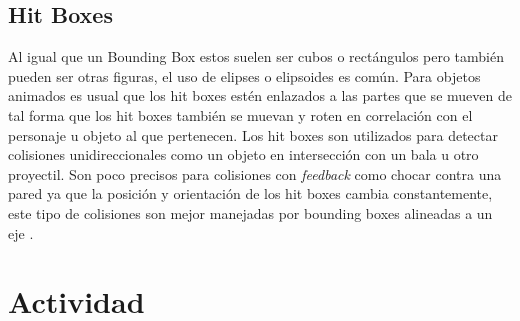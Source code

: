\subsection{Hit Boxes}
Al igual que un Bounding Box estos suelen ser cubos o rectángulos pero también pueden ser otras figuras, el uso de elipses o elipsoides es común. Para objetos animados es usual que los hit boxes estén enlazados a las partes que se mueven de tal forma que los hit boxes también se muevan y roten en correlación con el personaje u objeto al que pertenecen. Los hit boxes son utilizados para detectar colisiones unidireccionales como un objeto en intersección con un bala u otro proyectil. Son poco precisos para colisiones con \emph{feedback} como chocar contra una pared ya que la posición y orientación de los hit boxes cambia constantemente, este tipo de colisiones son mejor manejadas por bounding boxes alineadas a un eje \cite{valve_hit}. 

\section{Actividad}
